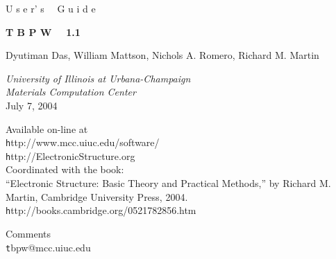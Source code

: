 \begin{titlepage}

\begin{center}

\vspace{1cm}
{\Huge {\sc U s e r' s \, \, G u i d e}}

\vspace{1cm}
\hrulefill
\vspace{2cm}

{\Huge {\bf T B P W \, \, 1.1}}

\vspace{2cm}
\hrulefill
\vspace{2cm}

{\Large Dyutiman Das, William Mattson, Nichols A. Romero, Richard
M. Martin} \\

\vspace{0.5cm}


\vspace{0.5cm}
{\Large{\it University of Illinois at Urbana-Champaign}} \\
{\Large{\it Materials Computation Center}} \\

\vspace{1.5cm} {\Large July 7, 2004}

\vspace{1.5cm}

Available on-line at\\

{\texttt http://www.mcc.uiuc.edu/software/} \\
{\texttt http://ElectronicStructure.org} \\

\vspace{.5cm}
Coordinated with the book: \\
``Electronic Structure: Basic Theory and Practical Methods,'' by
Richard M. Martin, Cambridge University Press,
2004.\\
 {\texttt http://books.cambridge.org/0521782856.htm}


\vspace{.5cm}
Comments\\
{\texttt tbpw@mcc.uiuc.edu}  \\

\end{center}

\end{titlepage}
